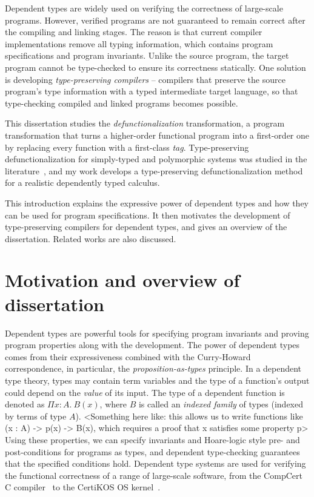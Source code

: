 
Dependent types are widely used on verifying the correctness of large-scale programs. However, verified programs are not guaranteed to remain correct after the compiling and linking stages. The reason is that current compiler implementations remove all typing information, which contains program specifications and program invariants. Unlike the source program, the target program cannot be type-checked to ensure its correctness statically. One solution is developing \textit{type-preserving compilers} – compilers that preserve the source program's type information with a typed intermediate target language, so that type-checking compiled and linked programs becomes possible.

This dissertation studies the \textit{defunctionalization} transformation, a program transformation that turns a higher-order functional program into a first-order one by replacing every function with a first-class \textit{tag}. Type-preserving defunctionalization for simply-typed and polymorphic systems was studied in the literature~\cite{DBLP:conf/acm/Reynolds72,DBLP:conf/popl/PottierG04}, and my work develops a type-preserving defunctionalization method for a realistic dependently typed calculus.

This introduction explains the expressive power of dependent types and how they can be used for program specifications. It then motivates the development of type-preserving compilers for dependent types, and gives an overview of the dissertation. Related works are also discussed.

\section{Motivation and overview of dissertation}

Dependent types are powerful tools for specifying program invariants and proving program properties along with the development. The power of dependent types comes from their expressiveness combined with the Curry-Howard correspondence, in particular, the \textit{proposition-as-types} principle. In a dependent type theory, types may contain term variables and the type of a function’s output could depend on the \textit{value} of its input. The type of a dependent function is denoted as $\Pi x:A.\ B(x)$, where $B$ is called an \textit{indexed family} of types (indexed by terms of type $A$). <Something here like: this allows us to write functions like (x : A) -> p(x) -> B(x), which requires a proof that x satisfies some property p> Using these properties, we can specify invariants and Hoare-logic style pre- and post-conditions for programs as types, and dependent type-checking guarantees that the specified conditions hold. Dependent type systems are used for verifying the functional correctness of a range of large-scale software, from the CompCert C compiler~\cite{DBLP:conf/popl/Leroy06} to the CertiKOS OS kernel~\cite{DBLP:conf/popl/GuKRSWWZG15}.

